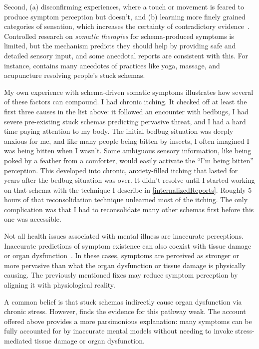 \documentclass[11pt,oneside]{book}
\let\cite\parencite
\begin{document}
Second, (a) disconfirming experiences, where a touch or movement is feared to produce symptom perception but doesn't, and (b) learning more finely grained categories of sensation, which increases the certainty of contradictory evidence~\cite{berghPsychogenic}. Controlled research on \textit{somatic therapies} for schema-produced symptoms is limited, but the mechanism predicts they should help by providing safe and detailed sensory input, and some anecdotal reports are consistent with this. For instance, \textcite{vanderKolkBody} contains many anecdotes of practices like yoga, massage, and acupuncture resolving people's stuck schemas.

My own experience with schema-driven somatic symptoms illustrates how several of these factors can compound. I had chronic itching. It checked off at least the first three causes in the list above: it followed an encounter with bedbugs, I had severe pre-existing stuck schemas predicting pervasive threat, and I had a hard time paying attention to my body. The initial bedbug situation was deeply anxious for me, and like many people being bitten by insects, I often imagined I was being bitten when I wasn't. Some ambiguous sensory information, like being poked by a feather from a comforter, would easily activate the \enquote{I'm being bitten} perception. This developed into chronic, anxiety-filled itching that lasted for years after the bedbug situation was over. It didn't resolve until I started working on that schema with the technique I describe in \cref{internalizedReports}. Roughly 5 hours of that reconsolidation technique unlearned most of the itching. The only complication was that I had to reconsolidate many other schemas first before this one was accessible.

Not all health issues associated with mental illness are inaccurate perceptions. Inaccurate predictions of symptom existence can also coexist with tissue damage or organ dysfunction~\cite{berghPsychogenic}. In these cases, symptoms are perceived as stronger or more pervasive than what the organ dysfunction or tissue damage is physically causing. The previously mentioned fixes may reduce symptom perception by aligning it with physiological reality.

A common belief is that stuck schemas indirectly cause organ dysfunction via chronic stress. However, \textcite{berghPsychogenic} finds the evidence for this pathway weak. The account offered above provides a more parsimonious explanation: many symptoms can be fully accounted for by inaccurate mental models without needing to invoke stress-mediated tissue damage or organ dysfunction.
\end{document}
